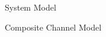 \documentclass{IEEEtran}
\begin{document}
\begin{section} {System Model}
	\begin{subsection}	{Composite Channel Model}


\end{subsection}
\end{section}
\end{document}
